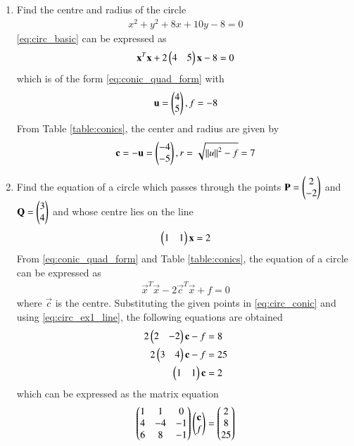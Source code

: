 \renewcommand{\theequation}{\theenumi}
\begin{enumerate}[label=\thesubsection.\arabic*.,ref=\thesubsection.\theenumi]
\item  Find the centre and radius of the circle 
\begin{align}
x^2+y^2+8x+10y-8 = 0
\label{eq:circ_basic}
\end{align}
\solution
\eqref{eq:circ_basic} can be expressed as 
\begin{align}
\mathbf{x}^T\mathbf{x}+ 2\begin{pmatrix}4 & 5\end{pmatrix}\mathbf{x} -8 = 0
\end{align}
which is of the form \eqref{eq:conic_quad_form} with
\begin{align}
\label{eq:circ_basic_uf}
\mathbf{u} = \begin{pmatrix}4\\5\end{pmatrix}, f = -8
\end{align}
From  Table \ref{table:conics}, the center and radius are given by 
\begin{align}
\mathbf{c} = -\mathbf{u} = \begin{pmatrix}-4\\-5\end{pmatrix},
r = \sqrt{\left\lVert u\right\rVert^2-f} = 7
\end{align}
\item Find the equation of a circle which passes through the points $\mathbf{P} = \begin{pmatrix}2\\-2\end{pmatrix}$ and $\mathbf{Q} = \begin{pmatrix}3\\4\end{pmatrix}$ and whose centre lies on the line  
\begin{align}
\label{eq:circ_ex1_line}
\begin{pmatrix}1 & 1\end{pmatrix} \mathbf{x} = 2
\end{align}
\solution From \eqref{eq:conic_quad_form} and Table \ref{table:conics}, the equation of a circle can be expressed as
\begin{align}
\label{eq:circ_conic}
\vec{x}^T\vec{x}-2\vec{c}^T\vec{x}+f = 0
\end{align}
where $\vec{c}$ is the centre.
Substituting the given points in 
\eqref{eq:circ_conic} and using 
\eqref{eq:circ_ex1_line}, the following equations are obtained
\begin{align}
2\begin{pmatrix}2 & -2\end{pmatrix}\mathbf{c} -  f &= 8
\\
2\begin{pmatrix}3 & 4\end{pmatrix}\mathbf{c} -  f &= 25
\\
\begin{pmatrix}1 & 1\end{pmatrix}\mathbf{c}  &= 2
\end{align}
which can be expressed as the matrix equation
\begin{align}
\myvec{
1 & 1 & 0
\\
4 & -4 & -1 
\\ 
6 & 8 & -1  
}
\myvec{\vec{c}\\f} = \myvec{2\\8\\25}

\end{align}
\end{enumerate}
